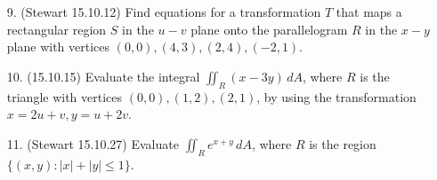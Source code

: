 \documentclass[11 pt]{report}
\begin{document}
\begin{enumerate} \item[9.] (Stewart 15.10.12) Find equations for a transformation $T$ that maps a rectangular region $S$ in the $u-v$ plane onto the parallelogram $R$ in the $x-y$ plane with vertices $(0,0), (4,3), (2,4), (-2,1)$. 

\item[10.] (15.10.15) Evaluate the integral $\displaystyle \iint_R (x-3y) \, dA$, where $R$ is the triangle with vertices $(0,0), (1,2), (2,1)$, by using the transformation $x = 2u+v, y = u+2v$. 

\item[11.] (Stewart 15.10.27) Evaluate $\displaystyle \iint_R e^{x+y} \, dA$, where $R$ is the region $\{(x,y): |x|+|y| \leq 1\}$. 


\end{enumerate}
\end{document}
